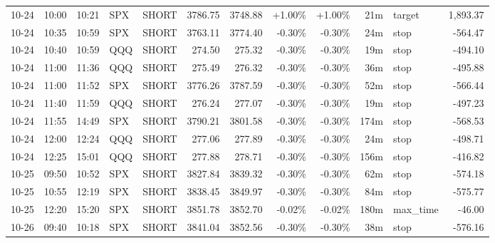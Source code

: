 \documentclass[11pt,a4paper,twoside]{article}
\begin{document}
\begin{center}
\begin{longtable}{>{\color{txtmain}}l l l l l r r r r r >{\color{txtmain}}l r}
10-24 & 10:00 & 10:21 & SPX & SHORT & 3786.75 & 3748.88 & \textcolor{wingreen}{+1.00\%} & \textcolor{wingreen}{+1.00\%} & 21m & target & \textcolor{wingreen}{1,893.37} \\
10-24 & 10:35 & 10:59 & SPX & SHORT & 3763.11 & 3774.40 & \textcolor{lossred}{-0.30\%} & \textcolor{lossred}{-0.30\%} & 24m & stop & \textcolor{lossred}{-564.47} \\
10-24 & 10:40 & 10:59 & QQQ & SHORT & 274.50 & 275.32 & \textcolor{lossred}{-0.30\%} & \textcolor{lossred}{-0.30\%} & 19m & stop & \textcolor{lossred}{-494.10} \\
10-24 & 11:00 & 11:36 & QQQ & SHORT & 275.49 & 276.32 & \textcolor{lossred}{-0.30\%} & \textcolor{lossred}{-0.30\%} & 36m & stop & \textcolor{lossred}{-495.88} \\
10-24 & 11:00 & 11:52 & SPX & SHORT & 3776.26 & 3787.59 & \textcolor{lossred}{-0.30\%} & \textcolor{lossred}{-0.30\%} & 52m & stop & \textcolor{lossred}{-566.44} \\
10-24 & 11:40 & 11:59 & QQQ & SHORT & 276.24 & 277.07 & \textcolor{lossred}{-0.30\%} & \textcolor{lossred}{-0.30\%} & 19m & stop & \textcolor{lossred}{-497.23} \\
10-24 & 11:55 & 14:49 & SPX & SHORT & 3790.21 & 3801.58 & \textcolor{lossred}{-0.30\%} & \textcolor{lossred}{-0.30\%} & 174m & stop & \textcolor{lossred}{-568.53} \\
10-24 & 12:00 & 12:24 & QQQ & SHORT & 277.06 & 277.89 & \textcolor{lossred}{-0.30\%} & \textcolor{lossred}{-0.30\%} & 24m & stop & \textcolor{lossred}{-498.71} \\
10-24 & 12:25 & 15:01 & QQQ & SHORT & 277.88 & 278.71 & \textcolor{lossred}{-0.30\%} & \textcolor{lossred}{-0.30\%} & 156m & stop & \textcolor{lossred}{-416.82} \\
10-25 & 09:50 & 10:52 & SPX & SHORT & 3827.84 & 3839.32 & \textcolor{lossred}{-0.30\%} & \textcolor{lossred}{-0.30\%} & 62m & stop & \textcolor{lossred}{-574.18} \\
10-25 & 10:55 & 12:19 & SPX & SHORT & 3838.45 & 3849.97 & \textcolor{lossred}{-0.30\%} & \textcolor{lossred}{-0.30\%} & 84m & stop & \textcolor{lossred}{-575.77} \\
10-25 & 12:20 & 15:20 & SPX & SHORT & 3851.78 & 3852.70 & \textcolor{lossred}{-0.02\%} & \textcolor{lossred}{-0.02\%} & 180m & max\_time & \textcolor{lossred}{-46.00} \\
10-26 & 09:40 & 10:18 & SPX & SHORT & 3841.04 & 3852.56 & \textcolor{lossred}{-0.30\%} & \textcolor{lossred}{-0.30\%} & 38m & stop & \textcolor{lossred}{-576.16} \\

\end{longtable}
\end{center}
\end{document}
